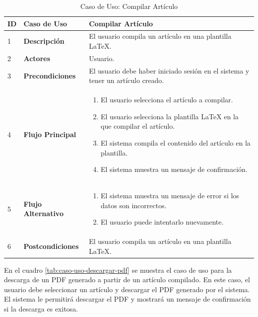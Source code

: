 \begin{table}[H]
    \centering
    \begin{tabular}{|p{0.5cm}|p{3.5cm}|p{10cm}|}
        \hline
        \textbf{ID} & \textbf{Caso de Uso} & \textbf{Compilar Artículo} \\
        \hline
        1 & \textbf{Descripción} & El usuario compila un artículo en una plantilla LaTeX. \\
        \hline
        2 & \textbf{Actores} & Usuario. \\
        \hline
        3 & \textbf{Precondiciones} & El usuario debe haber iniciado sesión en el sistema y tener un artículo creado. \\
        \hline
        4 & \textbf{Flujo Principal} & 
        \begin{enumerate}
            \item El usuario selecciona el artículo a compilar.
            \item El usuario selecciona la plantilla LaTeX en la que compilar el artículo.
            \item El sistema compila el contenido del artículo en la plantilla.
            \item El sistema muestra un mensaje de confirmación.
        \end{enumerate} \\
        \hline
        5 & \textbf{Flujo Alternativo} & 
        \begin{enumerate}
            \item El sistema muestra un mensaje de error si los datos son incorrectos.
            \item El usuario puede intentarlo nuevamente.
        \end{enumerate} \\
        \hline
        6 & \textbf{Postcondiciones} & El usuario compila un artículo en una plantilla LaTeX. \\
        \hline
    \end{tabular}
    \caption{Caso de Uso: Compilar Artículo}
\label{tab:caso-uso-compilar-articulo}

\end{table}

En el cuadro \ref{tab:caso-uso-descargar-pdf} se muestra el caso de uso para la descarga de un PDF generado a partir de un artículo compilado. En este caso, el usuario debe seleccionar un artículo y descargar el PDF generado por el sistema. El sistema le permitirá descargar el PDF y mostrará un mensaje de confirmación si la descarga es exitosa.

